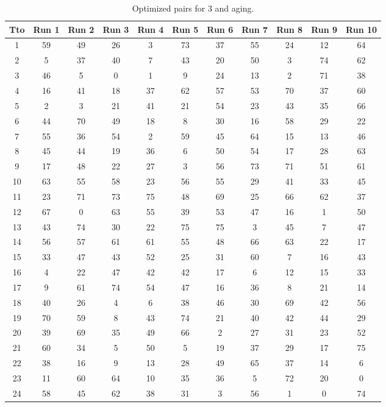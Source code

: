 \begin{table}
  \centering
  \scriptsize
  \caption{Optimized pairs for 3 and aging.}
  \label{tab_pairs}
\begin{tabular}{c c c c c c c c c c c }
\hline
Tto & Run 1 & Run 2 & Run 3 & Run 4 & Run 5 & Run 6 & Run 7 & Run 8 & Run 9 & Run 10 \\
\hline
1 & 59 & 49 & 26 & 3 & 73 & 37 & 55 & 24 & 12 & 64 \\
2 & 5 & 37 & 40 & 7 & 43 & 20 & 50 & 3 & 74 & 62 \\
3 & 46 & 5 & 0 & 1 & 9 & 24 & 13 & 2 & 71 & 38 \\
4 & 16 & 41 & 18 & 37 & 62 & 57 & 53 & 70 & 37 & 60 \\
5 & 2 & 3 & 21 & 41 & 21 & 54 & 23 & 43 & 35 & 66 \\
6 & 44 & 70 & 49 & 18 & 8 & 30 & 16 & 58 & 29 & 22 \\
7 & 55 & 36 & 54 & 2 & 59 & 45 & 64 & 15 & 13 & 46 \\
8 & 45 & 44 & 19 & 36 & 6 & 50 & 54 & 17 & 28 & 63 \\
9 & 17 & 48 & 22 & 27 & 3 & 56 & 73 & 71 & 51 & 61 \\
10 & 63 & 55 & 58 & 23 & 56 & 55 & 29 & 41 & 33 & 45 \\
11 & 23 & 71 & 73 & 75 & 48 & 69 & 25 & 66 & 62 & 37 \\
12 & 67 & 0 & 63 & 55 & 39 & 53 & 47 & 16 & 1 & 50 \\
13 & 43 & 74 & 30 & 22 & 75 & 75 & 3 & 45 & 7 & 47 \\
14 & 56 & 57 & 61 & 61 & 55 & 48 & 66 & 63 & 22 & 17 \\
15 & 33 & 47 & 43 & 52 & 25 & 31 & 60 & 7 & 16 & 43 \\
16 & 4 & 22 & 47 & 42 & 42 & 17 & 6 & 12 & 15 & 33 \\
17 & 9 & 61 & 74 & 54 & 47 & 16 & 36 & 8 & 21 & 14 \\
18 & 40 & 26 & 4 & 6 & 38 & 46 & 30 & 69 & 42 & 56 \\
19 & 70 & 59 & 8 & 43 & 74 & 21 & 40 & 42 & 44 & 29 \\
20 & 39 & 69 & 35 & 49 & 66 & 2 & 27 & 31 & 23 & 52 \\
21 & 60 & 34 & 5 & 50 & 5 & 19 & 37 & 29 & 17 & 75 \\
22 & 38 & 16 & 9 & 13 & 28 & 49 & 65 & 37 & 14 & 6 \\
23 & 11 & 60 & 64 & 10 & 35 & 36 & 5 & 72 & 20 & 0 \\
24 & 58 & 45 & 62 & 38 & 31 & 3 & 56 & 1 & 0 & 74 \\

\end{tabular}
\end{table}

